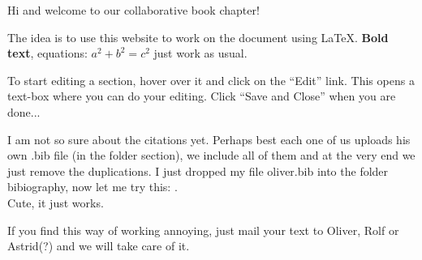 Hi and welcome to our collaborative book chapter!  

The idea is to use this website to work on the document using \LaTeX.  \textbf{Bold text}, equations: $a^2+b^2=c^2$ just work as usual.  

To start editing a section, hover over it and click on the ``Edit'' link.  This opens a text-box where you can do your editing.  Click ``Save and Close'' when you are done...

I am not so sure about the citations yet.  Perhaps best each one of us uploads his own .bib file (in the folder section), we include all of them and at the very end we just remove the duplications.  
I just dropped my file oliver.bib into the folder bibiography, now let me try this: \cite{buehler2012}.\\
Cute, it just works.  

If you find this way of working annoying, just mail your text to Oliver, Rolf or Astrid(?) and we will take care of it.  